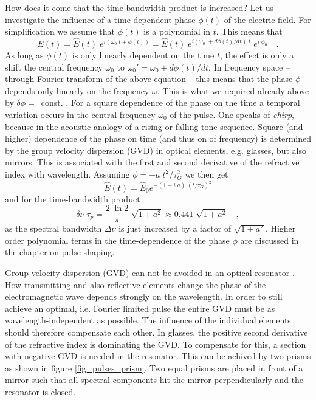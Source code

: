 How does it come that the time-bandwidth product is increased? 
Let us investigate the  influence of a time-dependent phase $\phi(t)$
of the electric field. For simplification we 
assume that $\phi(t)$ is a polynomial in $t$. This means that
\begin{equation}
  E(t) = \hat{E}(t) \; e^{i ( \omega_0 \; t + \phi(t))}
  = \hat{E}(t) \; e^{i ( \omega_0 \; + d\phi(t)/dt) \; t} \; e^{i
  \; \phi_0}  \quad . \label{gl_theo_nlo_ml_field_with_phase}
\end{equation}
As long as $\phi(t)$ is only linearly dependent on the time $t$, the effect is
 only a shift the central frequency $\omega_0$ to
$\omega_0' = \omega_0 + d\phi(t)/dt$.  In frequency space -- through
Fourier transform of the above equation --  this means that the
phase $\phi$ depends only linearly on the frequency $\omega$. This
is what we required already above by  
$\delta \phi =$~const. . For a square
dependence of the phase on the time a temporal variation occurs
in the central frequency $\omega_0$ of the pulse. One  speaks
of \emph{chirp}, because in the acoustic analogy of a
rising or falling tone sequence. Square
(and higher) dependence of the phase on time (and thus on
of frequency) is determined by the group velocity dispersion
(GVD) in optical elements,
e.g. glasses, but also mirrors. This is associated with the
first and second derivative of the refractive index with 
wavelength. Assuming $\phi = - a \;
t^2 / \tau_G^2$ we then get
\begin{equation}
  \hat{E}(t) = \hat{E}_0 e^{- (1 + i \; a) \; ( t / \tau_G ) ^2}
\end{equation}
and for the time-bandwidth product
\begin{equation}
  \delta \nu \; \tau_p = \frac{2 \; \ln 2}{\pi} \; \sqrt{1 + a^2} \approx
  0.441 \; \sqrt{1 + a^2} \quad ,
\end{equation}
as the spectral bandwidth $\Delta \nu$ is just increased by a factor of
$\sqrt{1 + a^2}$. Higher order polynomial terms in the time-dependence of the phase $\phi$ are discussed in the chapter on  pulse shaping.






Group velocity dispersion (GVD) can not be avoided  in an
optical resonator . How transmitting and
also reflective elements change the phase of the
electromagnetic wave  depends strongly on the wavelength. In order to still achieve an optimal, i.e. Fourier limited pulse
the entire GVD must be as wavelength-independent as possible. The influence of the individual elements should therefore 
compensate  each other. In glasses, the positive second derivative of the refractive index
is dominating  the GVD. To compensate for this, a section with
negative GVD is needed in the resonator. This can be  achived by two prisms as shown in figure
\ref{fig_pulses_prism}. Two equal
prisms are placed in front of a mirror such 
that all spectral components hit the mirror perpendicularly
and  the resonator is closed.  

